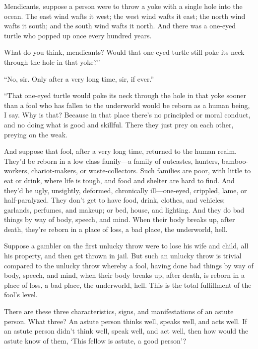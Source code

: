 \documentclass[12pt,openany]{book}%
\begin{document}
Mendicants, suppose a person were to throw a yoke with a single hole into the ocean. The east wind wafts it west; the west wind wafts it east; the north wind wafts it south; and the south wind wafts it north. And there was a one-eyed turtle who popped up once every hundred years. 

What do you think, mendicants? Would that one-eyed turtle still poke its neck through the hole in that yoke?” 

“No, sir. Only after a very long time, sir, if ever.” 

“That one-eyed turtle would poke its neck through the hole in that yoke sooner than a fool who has fallen to the underworld would be reborn as a human being, I say. Why is that? Because in that place there’s no principled or moral conduct, and no doing what is good and skillful. There they just prey on each other, preying on the weak. 

And suppose that fool, after a very long time, returned to the human realm. They’d be reborn in a low class family—a family of outcastes, hunters, bamboo-workers, chariot-makers, or waste-collectors. Such families are poor, with little to eat or drink, where life is tough, and food and shelter are hard to find. And they’d be ugly, unsightly, deformed, chronically ill—one-eyed, crippled, lame, or half-paralyzed. They don’t get to have food, drink, clothes, and vehicles; garlands, perfumes, and makeup; or bed, house, and lighting. And they do bad things by way of body, speech, and mind. When their body breaks up, after death, they’re reborn in a place of loss, a bad place, the underworld, hell. 

Suppose a gambler on the first unlucky throw were to lose his wife and child, all his property, and then get thrown in jail. But such an unlucky throw is trivial compared to the unlucky throw whereby a fool, having done bad things by way of body, speech, and mind, when their body breaks up, after death, is reborn in a place of loss, a bad place, the underworld, hell. This is the total fulfillment of the fool’s level. 

There are these three characteristics, signs, and manifestations of an astute person. What three? An astute person thinks well, speaks well, and acts well. If an astute person didn’t think well, speak well, and act well, then how would the astute know of them, ‘This fellow is astute, a good person’? 
\end{document}
